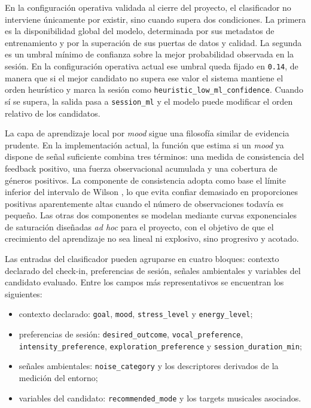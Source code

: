 En la configuración operativa validada al cierre del proyecto, el clasificador
no interviene únicamente por existir, sino cuando supera dos condiciones. La
primera es la disponibilidad global del modelo, determinada por sus metadatos
de entrenamiento y por la superación de sus puertas de datos y calidad. La
segunda es un umbral mínimo de confianza sobre la mejor probabilidad observada
en la sesión. En la configuración operativa actual ese umbral queda
fijado en \texttt{0.14}, de manera que si el mejor candidato no supera ese
valor el sistema mantiene el orden heurístico y marca la sesión como
\texttt{heuristic\_low\_ml\_confidence}. Cuando sí se supera, la salida pasa a
\texttt{session\_ml} y el modelo puede modificar el orden relativo de los
candidatos.

La capa de aprendizaje local por \textit{mood} sigue una filosofía similar de
evidencia prudente. En la implementación actual, la función que estima si un
\textit{mood} ya dispone de señal suficiente combina tres términos: una medida
de consistencia del feedback positivo, una fuerza observacional acumulada y una
cobertura de géneros positivos. La componente de consistencia adopta como base
el límite inferior del intervalo de Wilson \cite{wilson_1927}, lo que evita
confiar demasiado en proporciones positivas aparentemente altas cuando el
número de observaciones todavía es pequeño. Las otras dos componentes se
modelan mediante curvas exponenciales de saturación diseñadas \textit{ad hoc}
para el proyecto, con el objetivo de que el crecimiento del aprendizaje no sea
lineal ni explosivo, sino progresivo y acotado.

Las entradas del clasificador pueden agruparse en cuatro bloques: contexto
declarado del check-in, preferencias de sesión, señales ambientales y
variables del candidato evaluado. Entre los campos más representativos se
encuentran los siguientes:

\begin{itemize}
\item contexto declarado: \texttt{goal}, \texttt{mood}, \texttt{stress\_level} y \texttt{energy\_level};
\item preferencias de sesión: \texttt{desired\_outcome}, \texttt{vocal\_preference}, \texttt{intensity\_preference}, \texttt{exploration\_preference} y \texttt{session\_duration\_min};
\item señales ambientales: \texttt{noise\_category} y los descriptores derivados de la medición del entorno;
\item variables del candidato: \texttt{recommended\_mode} y los targets musicales asociados.
\end{itemize}


